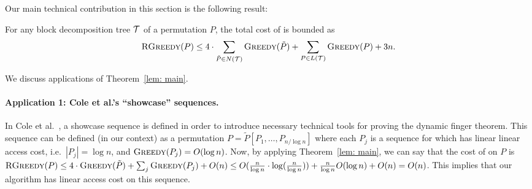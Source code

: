 

Our main technical contribution in this section is the following result: 

\begin{theorem}  
\label{lem: main} 
For any block decomposition tree ${\mathcal T}$ of a permutation $P$, the total cost of \agreedy is bounded as \[ \textsc{RGreedy}(P) \leq 4 \cdot \sum_{\tilde P \in N({\mathcal T}) }  \textsc{Greedy}(\tilde P) + \sum_{P \in L({\mathcal T}) } \textsc{Greedy}(P)+ 3n.\]
\end{theorem} 


We discuss applications of Theorem~\ref{lem: main}.  

\paragraph{Application 1: Cole et al.'s ``showcase'' sequences.}
In Cole et al.~\cite{finger1}, a showcase sequence is defined in order to introduce necessary technical tools for proving the dynamic finger theorem. 
This sequence can be defined (in our context) as a permutation $P = \tilde P[P_1,\ldots, P_{n/\log n}]$ where each $P_j$ is a sequence for which \greedy has linear linear access cost, i.e.\ $|P_j| = \log n$, and $\textsc{Greedy}(P_j) = O(\log n)$. 
Now, by applying Theorem~\ref{lem: main}, we can say that the cost of \agreedy on $P$ is $\textsc{RGreedy}(P) \leq 4 \cdot \textsc{Greedy}(\tilde P) + \sum_{j} \textsc{Greedy}(P_j) + O(n) \leq O(\frac{n}{\log n} \cdot \log (\frac{n}{\log n})) + \frac{n}{\log n}O(\log n) + O(n) = O(n)$. 
This implies that our algorithm has linear access cost on this sequence.  


